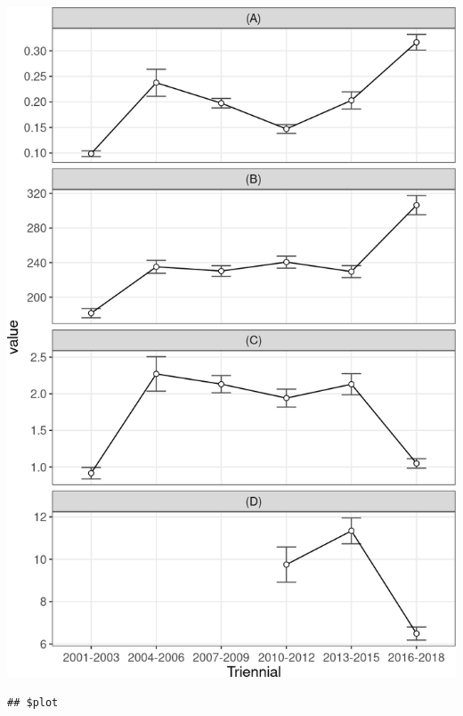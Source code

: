 \documentclass[10pt,landscape,a3paper]{article}
\begin{document}
\begin{center}\includegraphics{img/modelling/aa-eda-ts-9} \end{center}

\begin{verbatim}
## $plot
\end{verbatim}
\end{document}
